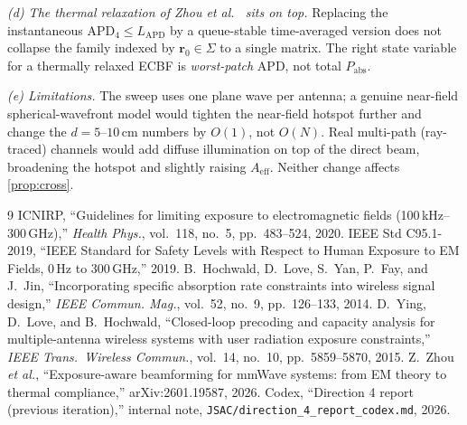 \documentclass[journal]{IEEEtran}
\newcommand{\rr}{\bm{r}}
\newcommand{\APD}{\mathrm{APD}}
\newcommand{\Pabs}{P_{\mathrm{abs}}}
\newcommand{\Aeff}{A_{\mathrm{eff}}}
\begin{document}
\emph{(d) The thermal relaxation of Zhou \emph{et al.}~\cite{Zhou2026}
sits on top.} Replacing the instantaneous
$\APD_4\!\le\!L_{\APD}$ by a queue-stable time-averaged version does
not collapse the family indexed by $\rr_0\in\Sigma$ to a single
matrix. The right state variable for a thermally relaxed ECBF is
\emph{worst-patch} APD, not total $\Pabs$.

\emph{(e) Limitations.} The sweep uses one plane wave per antenna; a
genuine near-field spherical-wavefront model would tighten the
near-field hotspot further and change the $d\!=\!5$--$10$\,cm
numbers by $O(1)$, not $O(N)$. Real multi-path (ray-traced) channels
would add diffuse illumination on top of the direct beam, broadening
the hotspot and slightly raising $\Aeff$. Neither change affects
\cref{prop:cross}.


\begin{thebibliography}{9}
 ICNIRP, ``Guidelines for limiting exposure to
  electromagnetic fields (100\,kHz--300\,GHz),'' \emph{Health Phys.},
  vol.~118, no.~5, pp.~483--524, 2020.
 IEEE Std C95.1-2019, ``IEEE Standard for Safety
  Levels with Respect to Human Exposure to EM Fields,
  0\,Hz to 300\,GHz,'' 2019.
 B.~Hochwald, D.~Love, S.~Yan, P.~Fay, and
  J.~Jin, ``Incorporating specific absorption rate constraints into
  wireless signal design,'' \emph{IEEE Commun. Mag.}, vol.~52, no.~9,
  pp.~126--133, 2014.
 D.~Ying, D.~Love, and B.~Hochwald, ``Closed-loop
  precoding and capacity analysis for multiple-antenna wireless
  systems with user radiation exposure constraints,'' \emph{IEEE
  Trans.\ Wireless Commun.}, vol.~14, no.~10, pp.~5859--5870, 2015.
 Z.~Zhou \emph{et al.}, ``Exposure-aware beamforming
  for mmWave systems: from EM theory to thermal compliance,''
  arXiv:2601.19587, 2026.
 Codex, ``Direction 4 report (previous iteration),''
  internal note, \texttt{JSAC/direction\_4\_report\_codex.md}, 2026.
\end{thebibliography}
\end{document}
